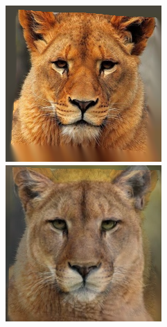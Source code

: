 \documentclass[conference]{IEEEtran}
\begin{document}
\begin{figure}[H]
\begin{multicols}{3}
    \centering
    \includegraphics[width=1.0\linewidth]{TestsCats/B/img01.png} \par
    \includegraphics[width=1.0\linewidth]{TestsCats/B/img30.png} \par
    

\end{multicols}
\end{figure}
\end{document}
